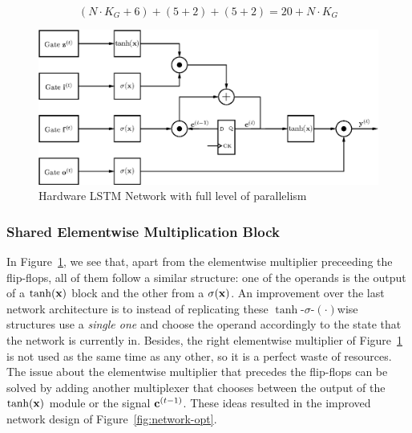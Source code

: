 \begin{equation}\label{eq:numcc_network}
    (N \cdot K_G + 6) + (5 + 2) + (5 + 2) = 20 + N\cdot K_G
\end{equation}

\begin{figure}
    \centering
    \includegraphics[width=0.9\linewidth]{figures/network.eps}
    \caption[Hardware LSTM Network with full level of parallelism]{Hardware LSTM Network with full level of parallelism}
    \label{fig:network}
\end{figure}

\subsubsection{Shared Elementwise Multiplication Block}\label{sec:struct-shared}
In Figure~\ref{fig:network}, we see that, apart from the elementwise multiplier preceeding the flip-flops, all of them follow a similar structure: one of the operands is the output of a $\tanh(\mathbf{x})$ block and the other from a $\sigma(\mathbf{x})$. An improvement over the last network architecture is to instead of replicating these $\tanh$-$\sigma$-$(\cdot)$wise structures use a \emph{single one} and choose the operand accordingly to the state that the network is currently in. Besides, the right elementwise multiplier of Figure~\ref{fig:network} is not used as the same time as any other, so it is a perfect waste of resources. The issue about the elementwise multiplier that precedes the flip-flops can be solved by adding another multiplexer that chooses between the output of the $\tanh(\mathbf{x})$ module or the signal $\mathbf{c}^{(t-1)}$. These ideas resulted in the improved network design of Figure~\ref{fig:network-opt}.

